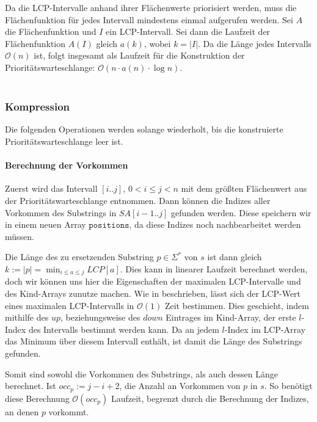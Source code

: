 Da die LCP-Intervalle anhand ihrer Flächenwerte priorisiert werden, muss die Flächenfunktion für jedes Intervall mindestens einmal aufgerufen werden. Sei $A$ die Flächenfunktion und $I$ ein LCP-Intervall. Sei dann die Laufzeit der Flächenfunktion $A(I)$ gleich $a(k)$, wobei $k = |I|$. 
Da die Länge jedes Intervalls $\mathcal{O}(n)$ ist, folgt insgesamt als Laufzeit für die Konstruktion der Prioritätswarteschlange: $\mathcal{O}(n \cdot a(n) \cdot \log n)$.\\\\

\subsubsection{Kompression}

Die folgenden Operationen werden solange wiederholt, bis die konstruierte Prioritätswarteschlange leer ist. 

\paragraph{Berechnung der Vorkommen}

Zuerst wird das Intervall $[i..j]$, $0 < i \leq j < n$ mit dem größten Flächenwert aus der Prioritätswarteschlange entnommen. Dann können die Indizes aller Vorkommen des Substrings in $SA[i-1..j]$ gefunden werden. Diese speichern wir in einem neuen Array $\texttt{positions}$, da diese Indizes noch nachbearbeitet werden müssen.

Die Länge des zu ersetzenden Substring $p \in \Sigma^*$ von $s$ ist dann gleich $k := |p| = \min_{i \leq a \leq j} LCP[a]$.
Dies kann in linearer Laufzeit berechnet werden, doch wir können uns hier die Eigenschaften der maximalen LCP-Intervalle und des Kind-Arrays zunutze machen. 
Wie in \cite{abouelhoda_optimal_2002} beschrieben, lässt sich der LCP-Wert eines maximalen LCP-Intervalls in $\mathcal{O}(1)$ Zeit bestimmen. Dies geschieht, indem mithilfe des $up$, beziehungsweise des $down$ Eintrages im Kind-Array, der erste $l$-Index des Intervalls bestimmt werden kann. Da an jedem $l$-Index im LCP-Array das Minimum über diesem Intervall enthält, ist damit die Länge des Substrings gefunden.

Somit sind sowohl die Vorkommen des Substrings, als auch dessen Länge berechnet. Ist $occ_p := j - i + 2$, die Anzahl an Vorkommen von $p$ in $s$. So benötigt diese Berechnung $\mathcal{O}(occ_p)$ Laufzeit, begrenzt durch die Berechnung der Indizes, an denen $p$ vorkommt.

